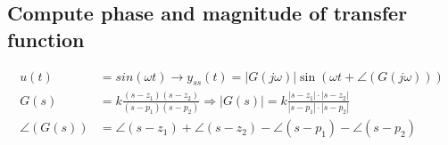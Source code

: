 \subsection{Compute phase and magnitude of transfer function}
\begin{align*}
    u(t) &= sin(\omega t) \rightarrow y_{ss}(t) = \left|G(j \omega)\right| \sin\left(\omega t + \angle(G(j \omega))\right)\\
    G(s) &= k \frac{(s-z_1)(s-z_2)}{(s-p_1)(s-p_2)} \Rightarrow
    |G(s)| = k \frac{|s-z_1| \cdot |s-z_2|}{|s-p_1| \cdot |s-p_2|}\\
    \angle(G(s)) &= \angle(s-z_1) + \angle(s-z_2) - \angle(s-p_1) - \angle(s-p_2)
\end{align*}